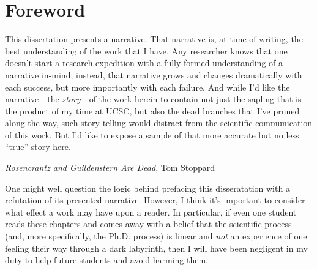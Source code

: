 
\begingroup
\let\clearpage\relax
\let\cleardoublepage\relax
\let\cleardoublepage\relax
\chapter*{Foreword}



This dissertation presents a narrative. That narrative is, at time of writing, the best understanding of the work that I
have. Any researcher knows that one doesn't start a research expedition with a fully formed understanding of a narrative
in-mind; instead, that narrative grows and changes dramatically with each success, but more importantly with each
failure. And while I'd like the narrative---the \emph{story}---of the work herein to contain not just the sapling that is the
product of my time at UCSC, but also the dead branches that I've pruned along the way, such story telling would distract
from the scientific communication of this work. But I'd like to expose a sample of that more accurate but no less ``true''
story here.

{\emph{Rosencrantz and Guildenstern Are Dead}, Tom Stoppard}

One might well question the logic behind prefacing this disseratation with a refutation of its presented narrative.
However, I think it's important to consider what effect a work may have upon a reader. In particular, if even one
student reads these chapters and comes away with a belief that the scientific process (and, more specifically, the Ph.D.
process) is linear and \emph{not} an experience of one feeling their way through a dark labyrinth, then I will have been
negligent in my duty to help future students and avoid harming them.


